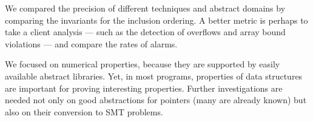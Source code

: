 \documentclass[preprint]{sigplanconf}
\begin{document}
We compared the precision of different techniques and abstract domains by comparing the invariants for the inclusion ordering. A better metric is perhaps to take a client analysis --- such as the detection of overflows and array bound violations --- and compare the rates of alarms.

We focused on numerical properties, because they are supported by easily available abstract libraries. Yet, in most programs, properties of data structures are important for proving interesting properties. Further investigations are needed not only on good abstractions for pointers (many are already known) but also on their conversion to SMT problems.









\end{document}
